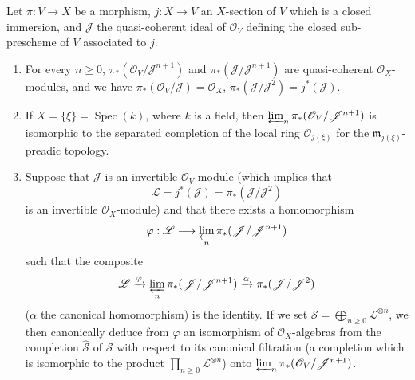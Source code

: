 \begin{lemma}[8.10.1]
\label{II.8.10.1}
Let $\pi:V\to X$ be a morphism, $j:X\to V$ an $X$-section of $V$ which is
a closed immersion, and $\mathcal{J}$ the quasi-coherent ideal of
$\mathcal{O}_V$ defining the closed sub-prescheme of $V$ associated to $j$.
\begin{enumerate}
  \item[\rm{(i)}] For every $n\geqslant 0$,
  $\pi_*(\mathcal{O}_V/\mathcal{J}^{n+1})$ and
  $\pi_*(\mathcal{J}/\mathcal{J}^{n+1})$ are quasi-coherent
  $\mathcal{O}_X$-modules, and we have
  $\pi_*(\mathcal{O}_V/\mathcal{J})=\mathcal{O}_X$,
  $\pi_*(\mathcal{J}/\mathcal{J}^2)=j^*(\mathcal{J})$.
  \item[\rm{(ii)}] If $X=\{\xi\}=\operatorname{Spec}(k)$, where $k$ is a
  field, then $\varprojlim_n\pi_*(\mathcal{O}_V/\mathcal{J}^{n+1})$ is
  isomorphic to the separated completion of the local ring
  $\mathcal{O}_{j(\xi)}$ for the $\mathfrak{m}_{j(\xi)}$-preadic topology.
  \item[\rm{(iii)}] Suppose that $\mathcal{J}$ is an invertible
  $\mathcal{O}_V$-module (which implies that
  \[
    \mathcal{L}=j^*(\mathcal{J})=
    \pi_*(\mathcal{J}/\mathcal{J}^2)
  \]
  is an invertible $\mathcal{O}_X$-module) and that there exists a
  homomorphism
  \[
    \varphi:\mathcal{L}\longrightarrow
    \varprojlim_n\pi_*(\mathcal{J}/\mathcal{J}^{n+1})
  \]
  such that the composite
  \[
    \mathcal{L}\xrightarrow{\varphi}
    \varprojlim_n\pi_*(\mathcal{J}/\mathcal{J}^{n+1})
    \xrightarrow{\alpha}\pi_*(\mathcal{J}/\mathcal{J}^2)
  \]
  ($\alpha$ the canonical homomorphism) is the identity. If we set
  $\mathcal{S}=\bigoplus_{n\geqslant0}\mathcal{L}^{\otimes n}$, we then
  canonically deduce from $\varphi$ an isomorphism of
  $\mathcal{O}_X$-algebras from the completion $\widehat{\mathcal{S}}$ of
  $\mathcal{S}$ with respect to its canonical filtration (a completion which
  is isomorphic to the product $\prod_{n\geqslant0}\mathcal{L}^{\otimes n}$)
  onto $\varprojlim_n\pi_*(\mathcal{O}_V/\mathcal{J}^{n+1})$.
\end{enumerate}
\end{lemma}

